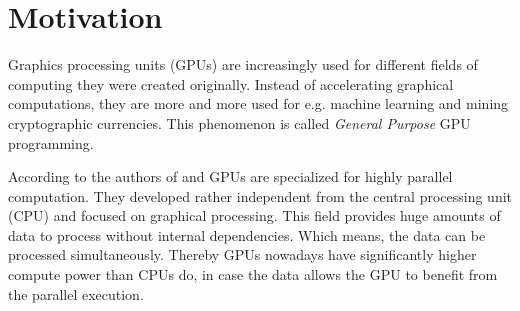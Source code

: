 \section{Motivation}
  Graphics processing units (GPUs) are increasingly used for different fields of computing they were created originally.
  Instead of accelerating graphical computations, they are more and more used for e.g. machine learning and mining cryptographic currencies.
  This phenomenon is called \textit{General Purpose} GPU programming.~\cite{8363085}~\cite{Owens.2008}
  
    According to the authors of \cite{NVIDIA.2019} and \cite{Rauber.2012} GPUs are specialized for highly parallel computation.
    They developed rather independent from the central processing unit (CPU) and focused on graphical processing.
    This field provides huge amounts of data to process without internal dependencies.
    Which means, the data can be processed simultaneously.
    Thereby GPUs nowadays have significantly higher compute power than CPUs do, in case the data allows the GPU to benefit from the parallel execution.